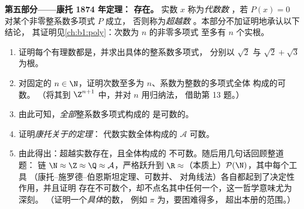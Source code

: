 \begin{problem}
\medskip
\noindent\textbf{第五部分——康托 1874 年定理：
存在。} 实数 $x$ 称为\emph{代数数}
，若 $P(x) = 0$ 对某个非零整系数多项式 $P$ 成立，
否则称为\emph{超越数}
。本部分不加证明地承认以下结论，
其证明见\cref{ch:b1:poly}：次数为 $n$ 的非零多项式
至多有 $n$ 个实根。
\begin{enumerate}[resume]
  \item 证明每个有理数都是，并求出具体的整系数多项式，
        分别以 $\sqrt 2$ 与
        $\sqrt 2 + \sqrt 3$ 为根。
  \item 对固定的 $n \in \N$，证明次数至多为 $n$、系数为整数的多项式全体
        构成的可数。
        （将其到 $\Z^{n+1}$ 中，并对 $n$ 用归纳法，
        借助第 13 题。）
  \item 由此可知，\emph{全部}整系数多项式构成的
        是可数的。
  \item 证明\emph{康托关于的定理}：
        代数实数全体构成的 $\mathcal{A}$ 可数。
  \item 由此得出：超越实数存在，且全体构成的
        不可数。随后用几句话回顾整道题：
        链 $\N \approx
        \Z \approx \Q \approx \mathcal{A}$，严格跃升到 $\R
        \approx$（本质上）$\mathcal{P}(\N)$，其中每个工具
        （康托–施罗德–伯恩斯坦定理、可数并、
        对角线法）各自都起到了决定性作用，并且证明
        存在不可数个，却不点名其中任何一个，这一哲学意味尤为深刻。
        （证明一个\emph{具体}的数，
        例如 $\pi$ 为，要困难得多，
        超出本册的范围。）
\end{enumerate}
\end{problem}
